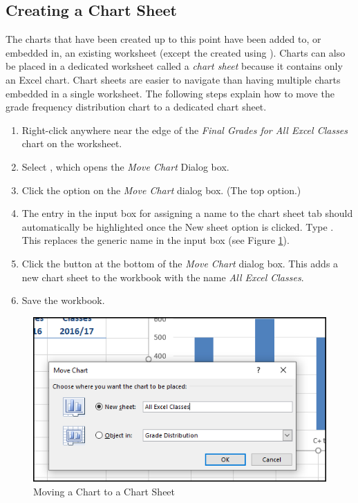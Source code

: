 \subsection{Creating a Chart Sheet}

The charts that have been created up to this point have been added to, or embedded in, an existing worksheet (except the  created using ). Charts can also be placed in a dedicated worksheet called a \textit{chart sheet} because it contains only an Excel chart. Chart sheets are easier to navigate than having multiple charts embedded in a single worksheet. The following steps explain how to move the grade frequency distribution chart to a dedicated chart sheet.

\begin{enumbox}
	\begin{enumerate}
		\item Right-click anywhere near the edge of the \textit{Final Grades for All Excel Classes} chart on the  worksheet.
		\item Select , which opens the \textit{Move Chart} Dialog box.
		\item Click the  option on the \textit{Move Chart} dialog box. (The top option.)
		\item The entry in the input box for assigning a name to the chart sheet tab should automatically be highlighted once the New sheet option is clicked. Type . This replaces the generic name in the input box (see Figure \ref{04:fig15}).
		\item Click the  button at the bottom of the \textit{Move Chart} dialog box. This adds a new chart sheet to the workbook with the name \textit{All Excel Classes}.
		\item Save the  workbook.
	\end{enumerate}
\end{enumbox}
	
\begin{figure}[H]
	\centering
	\includegraphics[width=\maxwidth{.95\linewidth}]{gfx/ch04_fig15}
	\caption{Moving a Chart to a Chart Sheet}
	\label{04:fig15}
\end{figure}

